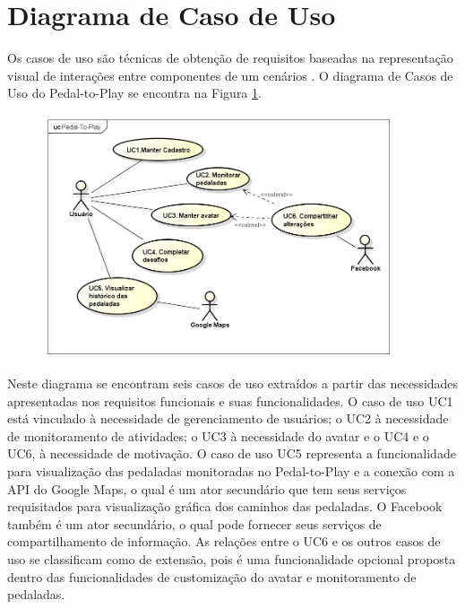 \pagebreak

\section{Diagrama de Caso de Uso}
Os casos de uso são técnicas de obtenção de requisitos baseadas na representação visual de interações entre componentes de um cenários \cite{sommerville2003engenharia}. O diagrama de Casos de Uso do Pedal-to-Play se encontra na Figura \ref{fig:usecase}.

\begin{figure}[h]
\begin{minipage}{1.0\textwidth}
    \centerline{\includegraphics[width=28em]{figuras/useCaseDiagram.png}}
    \label{fig:usecase}
\end{minipage}
\end{figure}

Neste diagrama se encontram seis casos de uso extraídos a partir das necessidades apresentadas nos requisitos funcionais e suas funcionalidades. O caso de uso UC1 está vinculado à necessidade de gerenciamento de usuários; o UC2 à necessidade de monitoramento de atividades; o UC3 à necessidade do avatar e o UC4 e o UC6, à necessidade de motivação. O caso de uso UC5 representa a funcionalidade para visualização das pedaladas monitoradas no Pedal-to-Play e a conexão com a API do Google Maps, o qual é um ator secundário que tem seus serviços requisitados para visualização gráfica dos caminhos das pedaladas. O Facebook também é um ator secundário, o qual pode fornecer seus serviços de compartilhamento de informação. As relações entre o UC6 e os outros casos de uso se classificam como de extensão, pois é uma funcionalidade opcional proposta dentro das funcionalidades de customização do avatar e monitoramento de pedaladas.

